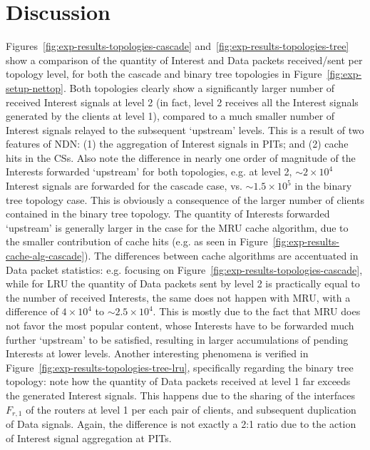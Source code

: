 \section{Discussion}
\label{sec:discussion}

Figures~\ref{fig:exp-results-topologies-cascade} and~\ref{fig:exp-results-topologies-tree} 
show a comparison of the quantity of Interest and Data packets received\slash sent 
per topology level, for both the cascade and binary tree topologies in 
Figure~\ref{fig:exp-setup-nettop}. Both topologies clearly show a significantly 
larger number of received Interest signals at level 2 (in fact, level 2 receives 
all the Interest signals generated by the clients at level 1), compared to 
a much smaller number of Interest signals relayed to the subsequent `upstream' 
levels. This is a result of two features of NDN: (1) the aggregation of Interest 
signals in PITs; and (2) cache hits in the CSs. Also note the 
difference in nearly one order of magnitude of the 
Interests forwarded `upstream' for both topologies, e.g. at level 2, $\sim2 \times 10^4$ Interest signals 
are forwarded for the cascade case, vs. $\sim1.5 \times 10^5$ in the binary 
tree topology case. This is obviously a consequence of the larger number of 
clients contained in the binary tree topology. The quantity of Interests forwarded 
`upstream' is generally larger in the case for the MRU cache algorithm, due to 
the smaller contribution of cache hits (e.g. as seen in 
Figure~\ref{fig:exp-results-cache-alg-cascade}). The differences between cache 
algorithms are accentuated in Data packet statistics: e.g. focusing on 
Figure~\ref{fig:exp-results-topologies-cascade}, while for LRU the quantity of 
Data packets sent by level 2 is practically equal to the number of received 
Interests, the same does not happen with MRU, with a difference of 
$4 \times 10^4$ to $\sim2.5 \times 10^4$. This is mostly due to the fact that 
MRU does not favor the most popular content, whose Interests have to be forwarded 
much further `upstream' to be satisfied, resulting in larger accumulations of 
pending Interests at lower levels. Another interesting phenomena is 
verified in Figure~\ref{fig:exp-results-topologies-tree-lru}, specifically 
regarding the binary tree topology: note how the quantity of Data packets 
received at level 1 far exceeds the generated Interest signals. This happens 
due to the sharing of the interfaces $F_{r,1}$ of the routers at level 1 per each pair of 
clients, and subsequent duplication of Data signals. Again, the difference is 
not exactly a 2:1 ratio due to the action of Interest signal aggregation at 
PITs.\shortvertbreak

